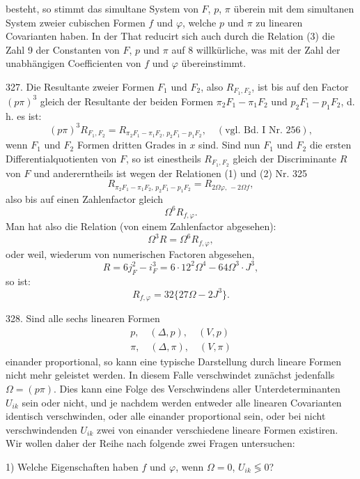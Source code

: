 besteht, so stimmt das simultane System von $F$, $p$, $\pi$ \"uberein mit dem simultanen System zweier cubischen Formen $f$ und $\varphi$, welche $p$ und $\pi$ zu linearen Covarianten haben. In der That reducirt sich auch durch die Relation (3) die Zahl 9 der Constanten von $F$, $p$ und $\pi$ auf 8 willk\"urliche, was mit der Zahl der unabh\"angigen Coefficienten von $f$ und $\varphi$ \"ubereinstimmt.

327.  Die Resultante zweier Formen $F_1$ und $F_2$, also $R_{F_1,F_2}$, ist bis auf den Factor $(p\pi)^3$ gleich der Resultante der beiden Formen $\pi_2F_1-\pi_1F_2$ und $p_2F_1-p_1F_2$, d.\,h. es ist:
\[
(p\pi)^3R_{F_1,F_2} = R_{\pi_2F_1-\pi_1F_2,\,p_2F_1-p_1F_2}, \quad (\text{vgl. Bd. I Nr. 256}),
\]
wenn $F_1$ und $F_2$ Formen dritten Grades in $x$ sind. Sind nun $F_1$ und $F_2$ die ersten Differentialquotienten von $F$, so ist einestheils $R_{F_1,F_2}$ gleich der Discriminante $R$ von $F$ und andererntheils ist wegen der Relationen (1) und (2) Nr. 325
\[
R_{\pi_2F_1-\pi_1F_2,\,p_2F_1-p_1F_2} = R_{2\Omega\varphi,\,-2\Omega f},
\]
also bis auf einen Zahlenfactor gleich
\[
\Omega^6R_{f,\varphi}.
\]
Man hat also die Relation (von einem Zahlenfactor abgesehen):
\[
\Omega^3R = \Omega^6R_{f,\varphi},
\]
oder weil, wiederum von numerischen Factoren abgesehen,
\[
R = 6j_F^2 - i_F^3 = 6\cdot12^2\Omega^4 - 64\Omega^3\cdot J^3,
\]
so ist:
\[
R_{f,\varphi} = 32\{27\Omega - 2J^3\}.
\]

328.  Sind alle sechs linearen Formen
\[
\begin{gathered}
p,\quad (\Delta,p),\quad (V,p)\\
\pi,\quad (\Delta,\pi),\quad (V,\pi)
\end{gathered}
\]
einander proportional, so kann eine typische Darstellung durch lineare Formen nicht mehr geleistet werden. In diesem Falle verschwindet zun\"achst jedenfalls $\Omega=(p\pi)$. Dies kann eine Folge des Verschwindens aller Unterdeterminanten $U_{ik}$ sein oder nicht, und je nachdem werden entweder alle linearen Covarianten identisch verschwinden, oder alle einander proportional sein, oder bei nicht verschwindenden $U_{ik}$ zwei von einander verschiedene lineare Formen existiren. Wir wollen daher der Reihe nach folgende zwei Fragen untersuchen:

1) Welche Eigenschaften haben $f$ und $\varphi$, wenn $\Omega=0$, $U_{ik}\lessgtr0$?

